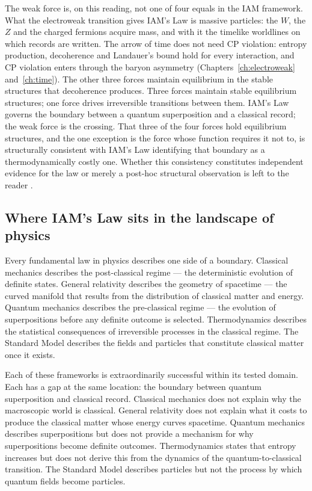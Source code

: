 The weak force is, on this reading, not one of four equals in the IAM framework. What the electroweak transition gives IAM's Law is massive
particles: the $W$, the $Z$ and the charged fermions acquire mass, and with it the timelike worldlines on which records are written. The arrow of time does
not need CP violation: entropy production, decoherence and Landauer's bound hold for every interaction, and CP violation enters through the baryon
asymmetry (Chapters~\ref{ch:electroweak} and~\ref{ch:time}). The other three forces maintain equilibrium in the stable structures that decoherence
produces. Three forces maintain stable equilibrium structures; one force drives irreversible transitions between
them. IAM's Law governs the boundary between a quantum superposition and a classical record; the weak force is the crossing. That three of the four
forces hold equilibrium structures, and the one exception is the force whose function requires it not to, is structurally consistent with IAM's Law
identifying that boundary as a thermodynamically costly one. Whether this consistency constitutes independent evidence for the law or merely a post-hoc
structural observation is left to the reader \conjecture.

\subsection{Where IAM's Law sits in the landscape of physics}
Every fundamental law in physics describes one side of a boundary. Classical mechanics describes the post-classical regime --- the deterministic evolution
of definite states. General relativity describes the geometry of spacetime --- the curved manifold that results from the distribution of classical matter
and energy. Quantum mechanics describes the pre-classical regime --- the evolution of superpositions before any definite outcome is selected.
Thermodynamics describes the statistical consequences of irreversible processes in the classical regime. The Standard Model describes the fields and
particles that constitute classical matter once it exists.

Each of these frameworks is extraordinarily successful within its tested domain. Each has a gap at the same location: the boundary between quantum
superposition and classical record. Classical mechanics does not explain why the macroscopic world is classical. General relativity does not explain what
it costs to produce the classical matter whose energy curves spacetime. Quantum mechanics describes superpositions but does not provide a mechanism for
why superpositions become definite outcomes. Thermodynamics states that entropy increases but does not derive this from the dynamics of the
quantum-to-classical transition. The Standard Model describes particles but not the process by which quantum fields become particles.

